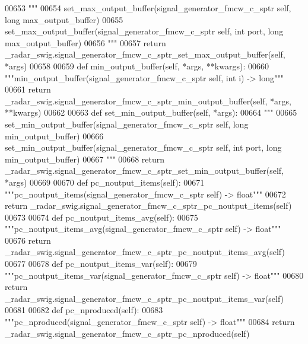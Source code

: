 \begin{DoxyCode}
{{{{00653         \textcolor{stringliteral}{"""}
00654 \textcolor{stringliteral}{        set\_max\_output\_buffer(signal\_generator\_fmcw\_c\_sptr self, long max\_output\_buffer)}
00655 \textcolor{stringliteral}{        set\_max\_output\_buffer(signal\_generator\_fmcw\_c\_sptr self, int port, long max\_output\_buffer)}
00656 \textcolor{stringliteral}{        """}
00657         \textcolor{keywordflow}{return} \_radar\_swig.signal\_generator\_fmcw\_c\_sptr\_set\_max\_output\_buffer(self, *args)
00658 
00659     \textcolor{keyword}{def }min_output_buffer(self, *args, **kwargs):
00660         \textcolor{stringliteral}{"""min\_output\_buffer(signal\_generator\_fmcw\_c\_sptr self, int i) -> long"""}
00661         \textcolor{keywordflow}{return} \_radar\_swig.signal\_generator\_fmcw\_c\_sptr\_min\_output\_buffer(self, *args, **kwargs)
00662 
00663     \textcolor{keyword}{def }set_min_output_buffer(self, *args):
00664         \textcolor{stringliteral}{"""}
00665 \textcolor{stringliteral}{        set\_min\_output\_buffer(signal\_generator\_fmcw\_c\_sptr self, long min\_output\_buffer)}
00666 \textcolor{stringliteral}{        set\_min\_output\_buffer(signal\_generator\_fmcw\_c\_sptr self, int port, long min\_output\_buffer)}
00667 \textcolor{stringliteral}{        """}
00668         \textcolor{keywordflow}{return} \_radar\_swig.signal\_generator\_fmcw\_c\_sptr\_set\_min\_output\_buffer(self, *args)
00669 
00670     \textcolor{keyword}{def }pc_noutput_items(self):
00671         \textcolor{stringliteral}{"""pc\_noutput\_items(signal\_generator\_fmcw\_c\_sptr self) -> float"""}
00672         \textcolor{keywordflow}{return} \_radar\_swig.signal\_generator\_fmcw\_c\_sptr\_pc\_noutput\_items(self)
00673 
00674     \textcolor{keyword}{def }pc_noutput_items_avg(self):
00675         \textcolor{stringliteral}{"""pc\_noutput\_items\_avg(signal\_generator\_fmcw\_c\_sptr self) -> float"""}
00676         \textcolor{keywordflow}{return} \_radar\_swig.signal\_generator\_fmcw\_c\_sptr\_pc\_noutput\_items\_avg(self)
00677 
00678     \textcolor{keyword}{def }pc_noutput_items_var(self):
00679         \textcolor{stringliteral}{"""pc\_noutput\_items\_var(signal\_generator\_fmcw\_c\_sptr self) -> float"""}
00680         \textcolor{keywordflow}{return} \_radar\_swig.signal\_generator\_fmcw\_c\_sptr\_pc\_noutput\_items\_var(self)
00681 
00682     \textcolor{keyword}{def }pc_nproduced(self):
00683         \textcolor{stringliteral}{"""pc\_nproduced(signal\_generator\_fmcw\_c\_sptr self) -> float"""}
00684         \textcolor{keywordflow}{return} \_radar\_swig.signal\_generator\_fmcw\_c\_sptr\_pc\_nproduced(self)
}}}}
\end{DoxyCode}
